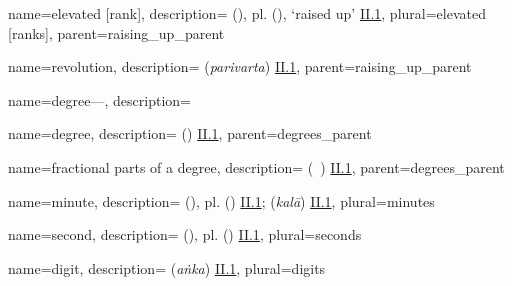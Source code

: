 {
        name={elevated [rank]},
        description={ (\marfu), pl.\thinspace {} (\marfuat), \lit `raised up' \hyperlink{Pii1}{II.1}},
        plural={elevated [ranks]},
        parent={raising_up_parent}
}

{
        name={revolution},
        description={ (\textit{parivarta}) \hyperlink{Sii1}{II.1}},
        parent={raising_up_parent}
}

{
        name={degree---},
        description={\phantom{x}\nopagebreak}
}

{
        name={degree},
        description={ (\daraj) \hyperlink{Pii1}{II.1}},
        parent={degrees_parent}
}

{
        name={fractional parts of a degree},
        description={ (\ajza\idafaconsonant\ \daraj) \hyperlink{Pii1}{II.1}},
        parent={degrees_parent}
}

{
        name={minute},
        description={ (\daqiqa), pl.\thinspace {} (\daqaiq) \hyperlink{Pii1}{II.1};  (\textit{kalā}) \hyperlink{Sii1}{II.1}},
        plural={minutes}
}

{
        name={second},
        description={ (\thaniya), pl.\thinspace {} (\thawani) \hyperlink{Pii1}{II.1}},
        plural={seconds}
}


{
        name={digit},
        description={ (\textit{aṅka}) \hyperlink{Sii1}{II.1}},
        plural={digits}
}